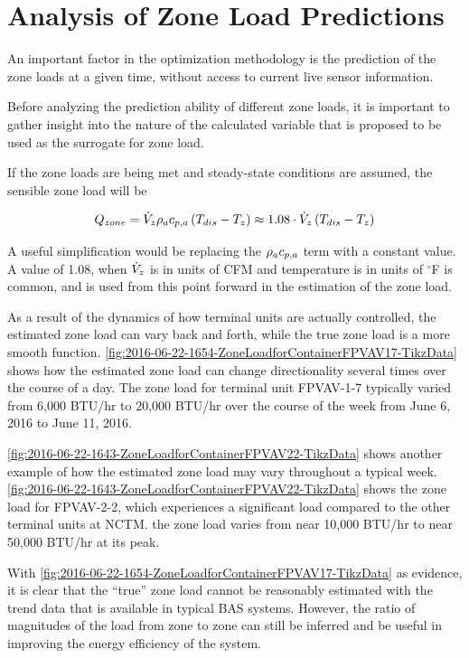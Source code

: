 \section{Analysis of Zone Load Predictions}

An important factor in the optimization methodology is the prediction of the zone loads at a given time, without access to current live sensor information. 

Before analyzing the prediction ability of different zone loads, it is important to gather insight into the nature of the calculated variable that is proposed to be used as the surrogate for zone load.   

If the zone loads are being met and steady-state conditions are assumed, the sensible zone load will be


\begin{equation}
    Q_{zone}=\dot{V}_{z} \rho_a c_{p,a}{} \left(T_{dis}-T_{z} \right) \approx 1.08 \cdot \dot{V}_{z}\left(T_{dis}-T_{z} \right)
\end{equation}

A useful simplification would be replacing the \(\rho_a c_{p,a}{}\) term with a constant value. A value of 1.08, when \(\dot{V}_{z}\) is in units of CFM and temperature is in units of \(^\circ\)F is common, and is used from this point forward in the estimation of the zone load.

As a result of the dynamics of how  terminal units are actually controlled, the estimated zone load can vary back and forth, while the true zone load is a more smooth function. \figref{} \ref{fig:2016-06-22-1654-ZoneLoadforContainerFPVAV17-TikzData} shows how the estimated zone load can change directionality several times over the course of a day. The zone load for terminal unit FPVAV-1-7 typically varied from 6,000 BTU/hr to 20,000 BTU/hr over the course of the week from June 6, 2016 to June 11, 2016.

\figref{} \ref{fig:2016-06-22-1643-ZoneLoadforContainerFPVAV22-TikzData} shows another example of how the estimated zone load may vary throughout a typical week. \figref{} \ref{fig:2016-06-22-1643-ZoneLoadforContainerFPVAV22-TikzData} shows the zone load for FPVAV-2-2, which experiences a significant load compared to the other terminal units at NCTM. the zone load varies from near 10,000 BTU/hr to near 50,000 BTU/hr at its peak.

With \figref{} \ref{fig:2016-06-22-1654-ZoneLoadforContainerFPVAV17-TikzData} as evidence, it is clear that the ``true'' zone load cannot be reasonably estimated with the trend data that is available in typical BAS systems. However, the ratio of magnitudes of the load from zone to zone can still be inferred and be useful in improving the energy efficiency of the system.  


